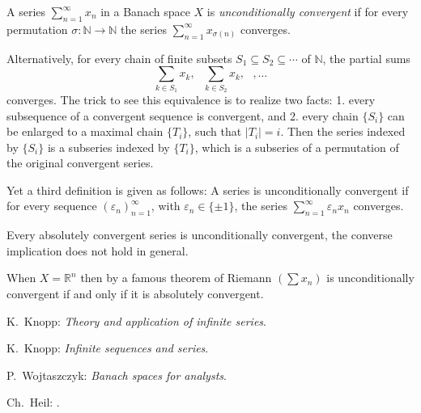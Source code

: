 \documentclass[12pt]{article}
\newcommand{\sR}[0]{\mathbb{R}}
\newcommand{\sN}[0]{\mathbb{N}}
\begin{document}
A series $\displaystyle{\sum_{n=1}^\infty x_n}$ in a Banach space $X$ is \emph{unconditionally convergent}
if for every permutation $\sigma: \sN \to \sN$ the series $\displaystyle{\sum_{n=1}^\infty x_{\sigma(n)}}$
converges.

Alternatively, for every chain of finite subsets $S_1\subseteq S_2\subseteq\cdots$ of $\mathbb{N}$, the partial sums
$$\sum_{k\in S_1} x_k,\mbox{ }\sum_{k\in S_2} x_k,\mbox{ },\ldots$$
converges.  The trick to see this equivalence is to realize two facts: 1. every subsequence of a convergent sequence is convergent, and 2. every chain $\lbrace S_i\rbrace$ can be enlarged to a maximal chain  $\lbrace T_i\rbrace$, such that $|T_i|=i$.  Then the series indexed by $\{S_i\}$ is a subseries indexed by $\{T_i\}$, which is a subseries of a permutation of the original convergent series.

Yet a third  definition is given as follows: A series is unconditionally convergent if
for every sequence $(\varepsilon_n)_{n=1}^\infty$, with $\varepsilon_n\in\{\pm 1\}$, the
series $\displaystyle{\sum_{n=1}^\infty \varepsilon_n x_n}$ converges.

Every absolutely convergent series is unconditionally convergent, the converse implication does not hold in general.

When $X=\sR^n$ then by a famous theorem of Riemann $(\sum x_n)$ is unconditionally convergent if and only if it is absolutely convergent.  

\begin{thebibliography}{5}

 K.~Knopp: {\em {Theory and application of infinite series}}.

 K.~Knopp: {\em {Infinite sequences and series}}.

 P.~Wojtaszczyk: {\em {Banach spaces for analysts}}.

Ch.~Heil: .


\end{thebibliography}
\end{document}
